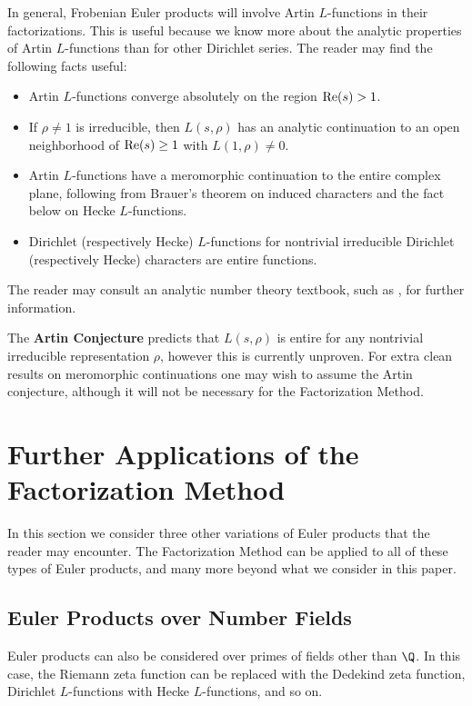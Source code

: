 \documentclass[12pt]{amsart}
\theoremstyle{plain}
\begin{document}
In general, Frobenian Euler products will involve Artin $L$-functions in their factorizations. This is useful because we know more about the analytic properties of Artin $L$-functions than for other Dirichlet series. The reader may find the following facts useful:
\begin{itemize}
    \item Artin $L$-functions converge absolutely on the region ${\rm Re}(s) > 1$.
    \item If $\rho\ne 1$ is irreducible, then $L(s,\rho)$ has an analytic continuation to an open neighborhood of ${\rm Re}(s) \ge 1$ with $L(1,\rho)\ne 0$.
    \item Artin $L$-functions have a meromorphic continuation to the entire complex plane, following from Brauer's theorem on induced characters and the fact below on Hecke $L$-functions.
    \item Dirichlet (respectively Hecke) $L$-functions for nontrivial irreducible Dirichlet (respectively Hecke) characters are entire functions.
\end{itemize}
The reader may consult an analytic number theory textbook, such as \cite{iwaniec-kowalski2004}, for further information.

The \textbf{Artin Conjecture} predicts that $L(s,\rho)$ is entire for any nontrivial irreducible representation $\rho$, however this is currently unproven. For extra clean results on meromorphic continuations one may wish to assume the Artin conjecture, although it will not be necessary for the Factorization Method.


\section{Further Applications of the Factorization Method}

In this section we consider three other variations of Euler products that the reader may encounter. The Factorization Method can be applied to all of these types of Euler products, and many more beyond what we consider in this paper.

\subsection{Euler Products over Number Fields}

Euler products can also be considered over primes of fields other than $\Q$. In this case, the Riemann zeta function can be replaced with the Dedekind zeta function, Dirichlet $L$-functions with Hecke $L$-functions, and so on.
\end{document}

